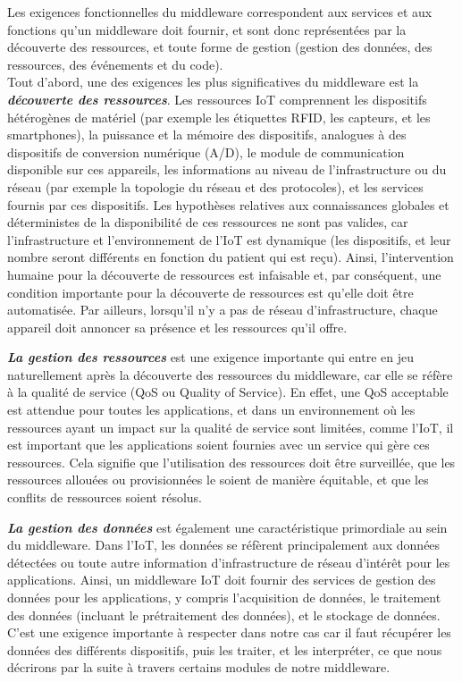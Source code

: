 Les exigences fonctionnelles du middleware correspondent aux services et aux fonctions qu’un middleware doit fournir, et sont donc représentées par la découverte des ressources, et toute forme de gestion (gestion des données, des ressources, des événements et du code).
\\

Tout d'abord, une des exigences les plus significatives du middleware est la \textbf{\textit{découverte des ressources}}. Les ressources IoT comprennent les dispositifs hétérogènes de matériel (par exemple les étiquettes RFID, les capteurs, et les smartphones), la puissance et la mémoire des dispositifs, analogues à des dispositifs de conversion numérique (A/D), le module de communication disponible sur ces appareils, les informations au niveau de l'infrastructure ou du réseau (par exemple la topologie du réseau et des protocoles), et les services fournis par ces dispositifs. Les hypothèses relatives aux connaissances globales et déterministes de la disponibilité de ces ressources ne sont pas valides, car l'infrastructure et l'environnement de l'IoT est dynamique (les dispositifs, et leur nombre seront différents en fonction du patient qui est reçu). Ainsi, l'intervention humaine pour la découverte de ressources est infaisable et, par conséquent, une condition importante pour la découverte de ressources est qu'elle doit être automatisée. Par ailleurs, lorsqu'il n'y a pas de réseau d'infrastructure, chaque appareil doit annoncer sa présence et les ressources qu'il offre.

\textbf{\textit{La gestion des ressources}} est une exigence importante qui entre en jeu naturellement après la découverte des ressources du middleware, car elle se réfère à la qualité de service (QoS ou Quality of Service). En effet, une QoS acceptable est attendue pour toutes les applications, et dans un environnement où les ressources ayant un impact sur la qualité de service sont limitées, comme l'IoT, il est important que les applications soient fournies avec un service qui gère ces ressources. Cela signifie que l'utilisation des ressources doit être surveillée, que les ressources allouées ou provisionnées le soient de manière équitable, et que les conflits de ressources soient résolus.

\textbf{\textit{La gestion des données}} est également une caractéristique primordiale au sein du middleware. Dans l'IoT, les données se réfèrent principalement aux données détectées ou toute autre information d'infrastructure de réseau d'intérêt pour les applications. Ainsi, un middleware IoT doit fournir des services de gestion des données pour les applications, y compris l'acquisition de données, le traitement des données (incluant le prétraitement des données), et le stockage de données. C'est une exigence importante à respecter dans notre cas car il faut récupérer les données des différents dispositifs, puis les traiter, et les interpréter, ce que nous décrirons par la suite à travers certains modules de notre middleware.


